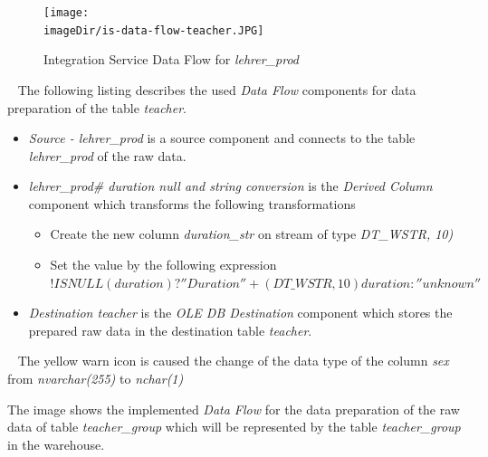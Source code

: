 \documentclass[11pt, a4paper, twoside]{article}   	%
\newcommand{\imageDir}{./images/}
\begin{document}
\begin{figure}[h]
\centering
\texttt{[image: \\imageDir/is-data-flow-teacher.JPG]}
\caption{Integration Service Data Flow for \emph{lehrer\_prod}}
\label{fig:is-data-flow-teacher}
\end{figure}
\ \newline
The following listing describes the used \emph{Data Flow} components for data preparation of the table \emph{teacher}.
\begin{itemize}
	\item \emph{Source - lehrer\_prod} is a source component and connects to the table \emph{lehrer\_prod} of the raw data.
	\item \emph{lehrer\_prod\# duration null and string conversion} is the \emph{Derived Column} component which transforms the following transformations
	\begin{itemize}
		\item Create the new column \emph{duration\_str} on stream of type \emph{DT\_WSTR, 10)}
		\item Set the value by the following expression 
		\newline
		$!ISNULL(duration) ? ''Duration '' + (DT\_WSTR,10)duration : ''unknown''$
	\end{itemize}
	\item \emph{Destination teacher} is the \emph{OLE DB Destination} component which stores the prepared raw data in the destination table \emph{teacher}.
\end{itemize}
\ \newline
The yellow warn icon is caused the change of the data type of the column \emph{sex} from \emph{nvarchar(255)} to \emph{nchar(1)}

\newpage

The image shows the implemented \emph{Data Flow} for the data preparation of the raw data of table \emph{teacher\_group} which will be represented by the table \emph{teacher\_group} in the warehouse.
\end{document}
